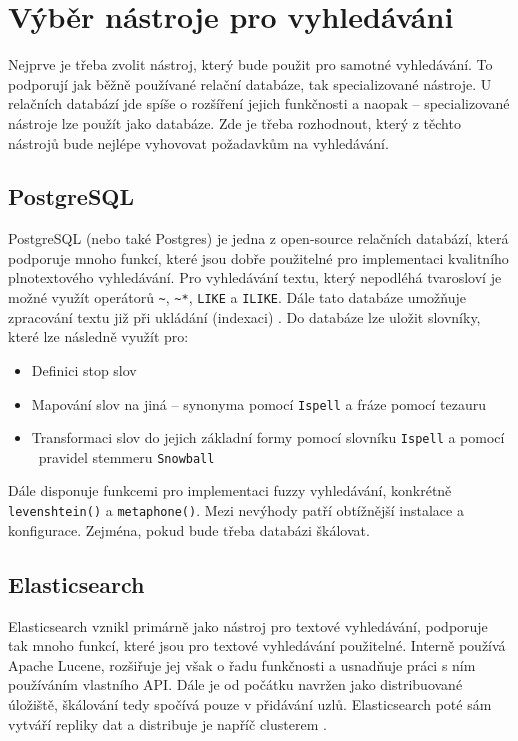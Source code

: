 \documentclass[FM,DP]{tulthesis}
\begin{document}
\section{Výběr nástroje pro vyhledáváni}

Nejprve je třeba zvolit nástroj, který bude použit pro samotné vyhledávání. To podporují 
jak běžně používané relační databáze, tak specializované nástroje. U relačních databází
jde spíše o rozšíření jejich funkčnosti a naopak -- specializované nástroje lze použít
jako databáze. Zde je třeba rozhodnout, který z těchto nástrojů bude nejlépe vyhovovat
požadavkům na vyhledávání.

\subsection{PostgreSQL}

PostgreSQL (nebo také Postgres) je jedna z open-source relačních databází, která podporuje
mnoho funkcí, které jsou dobře použitelné pro implementaci kvalitního plnotextového 
vyhledávání. Pro vyhledávání textu, který nepodléhá tvarosloví je možné využít operátorů
\verb|~|, \verb|~*|, \verb|LIKE| a \verb|ILIKE|. Dále tato databáze umožňuje zpracování
textu již při ukládání (indexaci) \cite{postgres-search}. Do databáze lze uložit slovníky, 
které lze následně využít pro:

\begin{itemize}
\item Definici stop slov
\item Mapování slov na jiná -- synonyma pomocí \verb|Ispell| a fráze pomocí tezauru
\item Transformaci slov do jejich základní formy pomocí slovníku \verb|Ispell| a pomocí \
pravidel stemmeru \verb|Snowball|
\end{itemize}

Dále disponuje funkcemi pro implementaci fuzzy vyhledávání, konkrétně \verb|levenshtein()|
a \verb|metaphone()|. Mezi nevýhody patří obtížnější instalace a konfigurace. Zejména, 
pokud bude třeba databázi škálovat.

\subsection{Elasticsearch}

Elasticsearch vznikl primárně jako nástroj pro textové vyhledávání, podporuje tak
mnoho funkcí, které jsou pro textové vyhledávání použitelné. Interně používá
Apache Lucene, rozšiřuje jej však o řadu funkčnosti a usnadňuje práci s ním
používáním vlastního API. Dále je od počátku navržen jako distribuované úložiště, 
škálování tedy spočívá pouze v přidávání uzlů. Elasticsearch poté sám vytváří
repliky dat a distribuje je napříč clusterem \cite{elastic}. 
\end{document}
